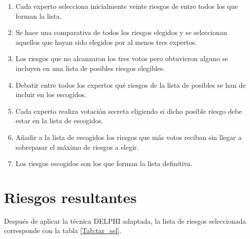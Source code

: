 \documentclass[11pt,a4paper,spanish,twoside]{book}
\begin{document}
\begin{enumerate}
\item Cada experto selecciona inicialmente veinte riesgos de entre todos los que
  forman la lista.
\item Se hace una comparativa de todos los riesgos elegidos y se seleccionan
  aquellos que hayan sido elegidos por al menos tres expertos.
\item Los riesgos que no alcanzaron los tres votos pero obtuvieron alguno se
  incluyen en una lista de posibles riesgos elegibles. 
\item Debatir entre todos los expertos qué riesgos de la lista de posibles se 
  han de incluir en los escogidos. 
\item Cada experto realiza votación secreta eligiendo si dicho posible riesgo 
  debe estar en la lista de escogidos.
\item Añadir a la lista de escogidos los riesgos que más votos reciban sin 
  llegar a sobrepasar el máximo de riesgos a elegir.
\item Los riesgos escogidos son los que forman la lista definitiva.
\end{enumerate}

\section{Riesgos resultantes}
Después de aplicar la técnica DELPHI adaptada, la lista de riesgos
seleccionada corresponde con la tabla \ref{Tab:tar_sel}.
\end{document}
